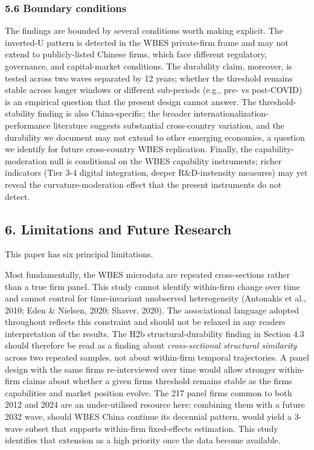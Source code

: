 \documentclass[12pt,a4paper]{article}
\begin{document}
\hypertarget{56-boundary-conditions}{%
\subsubsection{5.6 Boundary conditions}\label{56-boundary-conditions}}

The findings are bounded by several conditions worth making explicit.
The inverted-U pattern is detected in the WBES private-firm frame and
may not extend to publicly-listed Chinese firms, which face different
regulatory, governance, and capital-market conditions. The durability
claim, moreover, is tested across two waves separated by 12 years;
whether the threshold remains stable across longer windows or different
sub-periods (e.g., pre- vs post-COVID) is an empirical question that the
present design cannot answer. The threshold-stability finding is also
China-specific; the broader internationalization-performance literature
suggests substantial cross-country variation, and the durability we
document may not extend to other emerging economies, a question we
identify for future cross-country WBES replication. Finally, the
capability-moderation null is conditional on the WBES capability
instruments; richer indicators (Tier 3-4 digital integration, deeper
R\&D-instensity measures) may yet reveal the curvature-moderation effect
that the present instruments do not detect.

\hypertarget{6-limitations-and-future-research}{%
\subsection{6. Limitations and Future
Research}\label{6-limitations-and-future-research}}

This paper has six principal limitations.

Most fundamentally, the WBES microdata are repeated cross‑sections
rather than a true firm panel. This study cannot identify within‑firm
change over time and cannot control for time‑invariant unobserved
heterogeneity (Antonakis et al., 2010; Eden \& Nielsen, 2020; Shaver,
2020). The associational language adopted throughout reflects this
constraint and should not be relaxed in any reader\textquotesingle s
interpretation of the results. The H2b structural-durability finding in
Section 4.3 should therefore be read as a finding about
\emph{cross-sectional structural similarity} across two repeated
samples, not about within-firm temporal trajectories. A panel design
with the same firms re-interviewed over time would allow stronger
within-firm claims about whether a given firm\textquotesingle s
threshold remains stable as the firm\textquotesingle s capabilities and
market position evolve. The 217 panel firms common to both 2012 and 2024
are an under-utilised resource here; combining them with a future 2032
wave, should WBES China continue its decennial pattern, would yield a
3-wave subset that supports within-firm fixed-effects estimation. This
study identifies that extension as a high priority once the data become
available.
\end{document}
